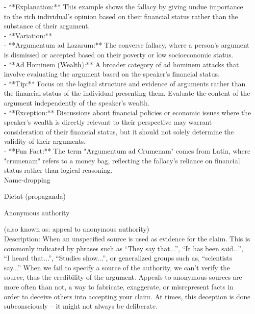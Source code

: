 \documentclass[a4paper,12pt,single,pdftex]{scrartcl}
\begin{document}
    
      - **Explanation:** This example shows the fallacy by giving undue importance to the rich individual’s opinion based on their financial status rather than the substance of their argument.
    \\

    
      - **Variation:**
    \\

    
        - **Argumentum ad Lazarum:** The converse fallacy, where a person's argument is dismissed or accepted based on their poverty or low socioeconomic status.
    \\

    
        - **Ad Hominem (Wealth):** A broader category of ad hominem attacks that involve evaluating the argument based on the speaker’s financial status.
    \\

    
      - **Tip:** Focus on the logical structure and evidence of arguments rather than the financial status of the individual presenting them. Evaluate the content of the argument independently of the speaker’s wealth.
    \\

    
      - **Exception:** Discussions about financial policies or economic issues where the speaker’s wealth is directly relevant to their perspective may warrant consideration of their financial status, but it should not solely determine the validity of their arguments.
    \\

    
      - **Fun Fact:** The term "Argumentum ad Crumenam" comes from Latin, where "crumenam" refers to a money bag, reflecting the fallacy’s reliance on financial status rather than logical reasoning.
    \\

  

Name-dropping

Dictat (propaganda)

Anonymous authority
    
      (also known as: appeal to anonymous authority)
    \\

  
    Description: When an unspecified source is used as evidence for the claim.  This is commonly indicated by phrases such as “They say that...”, “It has been said...”, “I heard that...”, “Studies show...”, or generalized groups such as, “scientists say...”  When we fail to specify a source of the authority, we can’t verify the source, thus the credibility of the argument.  Appeals to anonymous sources are more often than not, a way to fabricate, exaggerate, or misrepresent facts in order to deceive others into accepting your claim.  At times, this deception is done subconsciously -- it might not always be deliberate.
\end{document}

